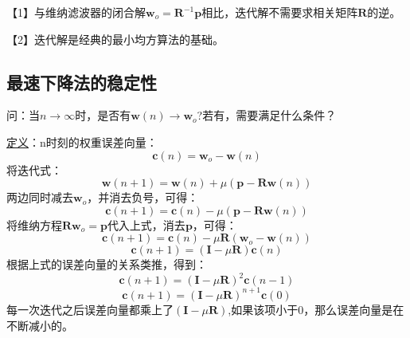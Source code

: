 \documentclass[UTF8]{ctexart} %
\begin{document}
			【1】与维纳滤波器的闭合解$\textbf{w}_o=\textbf{R}^{-1}\textbf{p}$相比，迭代解不需要求相关矩阵$\textbf{R}$的逆。
			
			【2】迭代解是经典的最小均方算法的基础。
			
		\subsection{最速下降法的稳定性}	
			问：当$n\rightarrow\infty$时，是否有$\textbf{w}(n)\rightarrow\textbf{w}_o$?若有，需要满足什么条件？
			
			\uline{定义}：n时刻的权重误差向量：
			\[\textbf{c}(n) = \textbf{w}_o -\textbf{w}(n)\]
			将迭代式：
			\[\textbf{w}(n+1) = \textbf{w}(n) + \mu(\textbf{p}-\textbf{Rw}(n))\]
			两边同时减去$\textbf{w}_o$，并消去负号，可得：
			\[\textbf{c}(n+1) = \textbf{c}(n) - \mu(\textbf{p}-\textbf{Rw}(n))\]
			将维纳方程$\textbf{Rw}_o=\textbf{p}$代入上式，消去$\textbf{p}$，可得：
			\[\textbf{c}(n+1) = \textbf{c}(n) -\mu\textbf{R}(\textbf{w}_o-\textbf{w}(n))\]
			\[\textbf{c}(n+1) = (\textbf{I}-\mu\textbf{R})\textbf{c}(n)\]
			根据上式的误差向量的关系类推，得到：
			\[\textbf{c}(n+1) = (\textbf{I}-\mu\textbf{R})^2\textbf{c}(n-1)\]
			\[\textbf{c}(n+1) = (\textbf{I}-\mu\textbf{R})^{n+1}\textbf{c}(0)\]
			每一次迭代之后误差向量都乘上了$(\textbf{I}-\mu\textbf{R})$,如果该项小于0，那么误差向量是在不断减小的。
			
\end{document}
